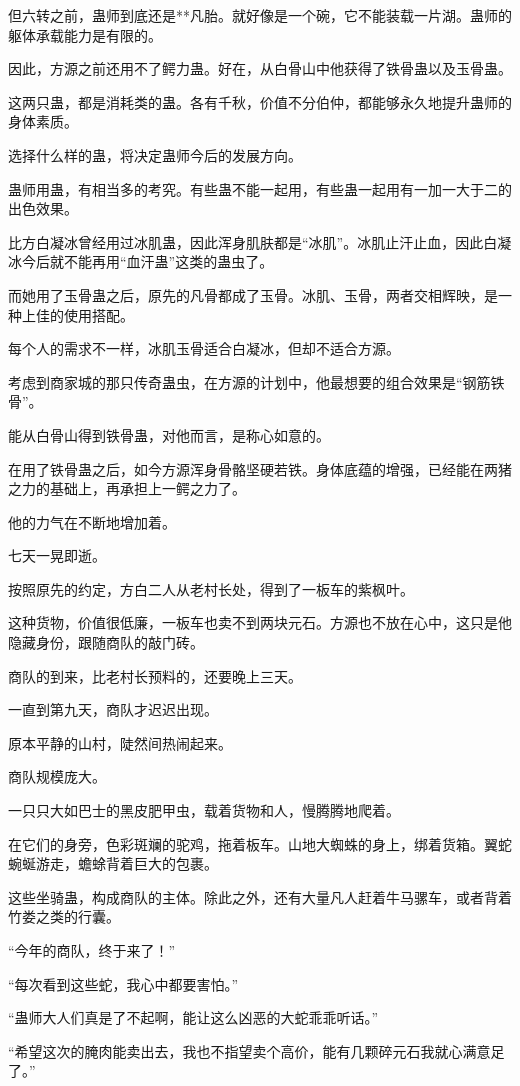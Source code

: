 \begin{this_body}
但六转之前，蛊师到底还是**凡胎。就好像是一个碗，它不能装载一片湖。蛊师的躯体承载能力是有限的。

因此，方源之前还用不了鳄力蛊。好在，从白骨山中他获得了铁骨蛊以及玉骨蛊。

这两只蛊，都是消耗类的蛊。各有千秋，价值不分伯仲，都能够永久地提升蛊师的身体素质。

选择什么样的蛊，将决定蛊师今后的发展方向。

蛊师用蛊，有相当多的考究。有些蛊不能一起用，有些蛊一起用有一加一大于二的出色效果。

比方白凝冰曾经用过冰肌蛊，因此浑身肌肤都是“冰肌”。冰肌止汗止血，因此白凝冰今后就不能再用“血汗蛊”这类的蛊虫了。

而她用了玉骨蛊之后，原先的凡骨都成了玉骨。冰肌、玉骨，两者交相辉映，是一种上佳的使用搭配。

每个人的需求不一样，冰肌玉骨适合白凝冰，但却不适合方源。

考虑到商家城的那只传奇蛊虫，在方源的计划中，他最想要的组合效果是“钢筋铁骨”。

能从白骨山得到铁骨蛊，对他而言，是称心如意的。

在用了铁骨蛊之后，如今方源浑身骨骼坚硬若铁。身体底蕴的增强，已经能在两猪之力的基础上，再承担上一鳄之力了。

他的力气在不断地增加着。

七天一晃即逝。

按照原先的约定，方白二人从老村长处，得到了一板车的紫枫叶。

这种货物，价值很低廉，一板车也卖不到两块元石。方源也不放在心中，这只是他隐藏身份，跟随商队的敲门砖。

商队的到来，比老村长预料的，还要晚上三天。

一直到第九天，商队才迟迟出现。

原本平静的山村，陡然间热闹起来。

商队规模庞大。

一只只大如巴士的黑皮肥甲虫，载着货物和人，慢腾腾地爬着。

在它们的身旁，色彩斑斓的驼鸡，拖着板车。山地大蜘蛛的身上，绑着货箱。翼蛇蜿蜒游走，蟾蜍背着巨大的包裹。

这些坐骑蛊，构成商队的主体。除此之外，还有大量凡人赶着牛马骡车，或者背着竹娄之类的行囊。

“今年的商队，终于来了！”

“每次看到这些蛇，我心中都要害怕。”

“蛊师大人们真是了不起啊，能让这么凶恶的大蛇乖乖听话。”

“希望这次的腌肉能卖出去，我也不指望卖个高价，能有几颗碎元石我就心满意足了。”


\end{this_body}
